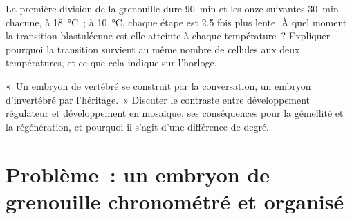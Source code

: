 \begin{exercise}[$\star\star\star$]\label{exo:b2:vertebrate-development:11}
La première division de la grenouille dure \qty{90}{min} et les onze
suivantes \qty{30}{min} chacune, à \qty{18}{\celsius}~; à
\qty{10}{\celsius}, chaque étape est 2.5 fois plus lente. À quel moment
la transition blastuléenne est-elle atteinte à chaque température~?
Expliquer pourquoi la transition survient au même nombre de cellules aux
deux températures, et ce que cela indique sur l'horloge.
\end{exercise}

\begin{exercise}[$\star\star\star$]\label{exo:b2:vertebrate-development:12}
«~Un embryon de vertébré se construit par la conversation, un embryon
d'invertébré par l'héritage.~» Discuter le contraste entre développement
régulateur et développement en mosaïque, ses conséquences pour la
gémellité et la régénération, et pourquoi il s'agit d'une différence de
degré.
\end{exercise}

\section{Problème~: un embryon de grenouille chronométré et organisé}

